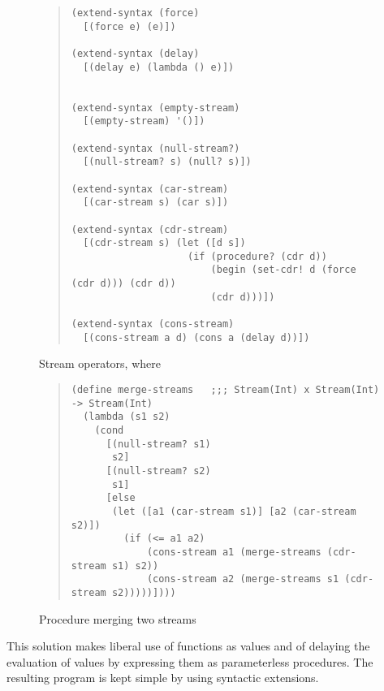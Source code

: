 \begin{figure}%
\begin{frameit}
\begin{quote}
\begin{verbatim}
(extend-syntax (force)
  [(force e) (e)])

(extend-syntax (delay)
  [(delay e) (lambda () e)])


(extend-syntax (empty-stream)
  [(empty-stream) '()])

(extend-syntax (null-stream?)
  [(null-stream? s) (null? s)])

(extend-syntax (car-stream)
  [(car-stream s) (car s)])

(extend-syntax (cdr-stream)
  [(cdr-stream s) (let ([d s])
                    (if (procedure? (cdr d))
                        (begin (set-cdr! d (force (cdr d))) (cdr d))
                        (cdr d)))])

(extend-syntax (cons-stream)
  [(cons-stream a d) (cons a (delay d))])

\end{verbatim}
\end{quote}
\caption{Stream operators,
         where 
}
\label{fig:stream-op}
\end{frameit}
\end{figure}

\begin{figure}%
\begin{frameit}
\begin{quote}
\begin{verbatim}
(define merge-streams   ;;; Stream(Int) x Stream(Int) -> Stream(Int)
  (lambda (s1 s2)
    (cond
      [(null-stream? s1)
       s2]
      [(null-stream? s2)
       s1]
      [else
       (let ([a1 (car-stream s1)] [a2 (car-stream s2)])
         (if (<= a1 a2)
             (cons-stream a1 (merge-streams (cdr-stream s1) s2))
             (cons-stream a2 (merge-streams s1 (cdr-stream s2)))))])))
\end{verbatim}
\end{quote}
\caption{Procedure merging two streams
}
\label{fig:stream-merge}
\end{frameit}
\end{figure}

This solution makes liberal use of functions as values and of
delaying the evaluation of values by expressing them as parameterless
procedures.  The resulting program is kept simple by using syntactic
extensions.


